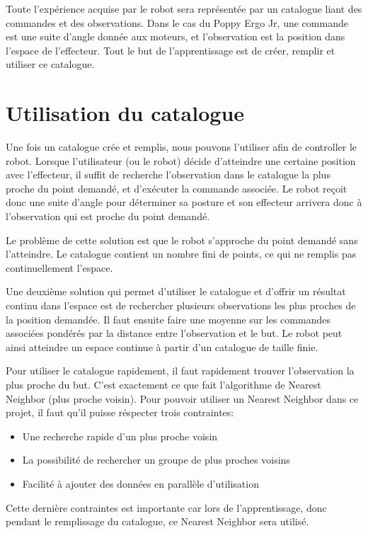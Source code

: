\documentclass[11pt,french]{report}
\begin{document}
Toute l'expérience acquise par le robot sera représentée par un catalogue liant des commandes et des observations.
Dans le cas du Poppy Ergo Jr, une commande est une suite d'angle donnée aux moteurs, et l'observation est la position dans l'espace de l'effecteur.
Tout le but de l'apprentissage est de créer, remplir et utiliser ce catalogue.

\section{Utilisation du catalogue}

Une fois un catalogue crée et remplis, nous pouvons l'utiliser afin de controller le robot.
Lorsque l'utilisateur (ou le robot) décide d'atteindre une certaine position avec l'effecteur, il suffit de recherche l'observation dans le catalogue la plus proche du point demandé, et d'exécuter la commande associée.
Le robot reçoit donc une suite d'angle pour déterminer sa posture et son effecteur arrivera donc à l'observation qui est proche du point demandé.

Le problème de cette solution est que le robot s'approche du point demandé sans l'atteindre.
Le catalogue contient un nombre fini de points, ce qui ne remplis pas continuellement l'espace.

Une deuxième solution qui permet d'utiliser le catalogue et d'offrir un résultat continu dans l'espace est de rechercher plusieurs observations les plus proches de la position demandée.
Il faut ensuite faire une moyenne sur les commandes associées pondérés par la distance entre l'observation et le but.
Le robot peut ainsi atteindre un espace continue à partir d'un catalogue de taille finie.

\phantom{INVISIBLE LINE}

Pour utiliser le catalogue rapidement, il faut rapidement trouver l'observation la plus proche du but.
C'est exactement ce que fait l'algorithme de Nearest Neighbor (plus proche voisin).
Pour pouvoir utiliser un Nearest Neighbor dans ce projet, il faut qu'il puisse réspecter trois contraintes:
\begin{itemize}
    \item Une recherche rapide d'un plus proche voisin
    \item La possibilité de rechercher un groupe de plus proches voisins
    \item Facilité à ajouter des données en parallèle d'utilisation
\end{itemize}
Cette dernière contraintes est importante car lors de l'apprentissage, donc pendant le remplissage du catalogue, ce Nearest Neighbor sera utilisé.
\end{document}
